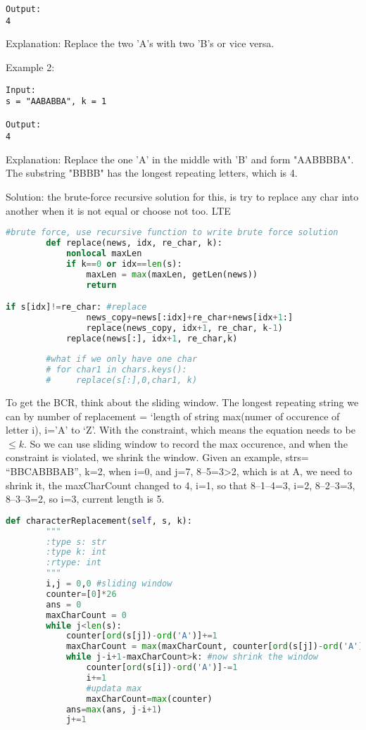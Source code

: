 \documentclass[../main.tex]{subfiles}
\begin{document}
\begin{enumerate}
\begin{lstlisting}
Output:
4
\end{lstlisting}

Explanation:
Replace the two 'A's with two 'B's or vice versa.

Example 2:
\begin{lstlisting}
Input:
s = "AABABBA", k = 1

Output:
4
\end{lstlisting}

Explanation:
Replace the one 'A' in the middle with 'B' and form "AABBBBA".
The substring "BBBB" has the longest repeating letters, which is 4.

Solution: the brute-force recursive solution for this, is try to replace any char into another when it is not equal or choose not too. LTE
\begin{lstlisting}[language = Python]
#brute force, use recursive function to write brute force solution
        def replace(news, idx, re_char, k):
            nonlocal maxLen
            if k==0 or idx==len(s):
                maxLen = max(maxLen, getLen(news))
                return

if s[idx]!=re_char: #replace
                news_copy=news[:idx]+re_char+news[idx+1:]
                replace(news_copy, idx+1, re_char, k-1)
            replace(news[:], idx+1, re_char,k)
        
        #what if we only have one char
        # for char1 in chars.keys():
        #     replace(s[:],0,char1, k)
\end{lstlisting}
To get the BCR, think about the sliding window. The longest repeating string we can by number of replacement = `length of string max(numer of occurence of letter i), i=’A’ to ‘Z’. With the constraint, which means the equation needs to be $\leq k$. So we can use sliding window to record the max occurence, and when the constraint is violated, we shrink the window. Given an example, strs= “BBCABBBAB”, k=2, when i=0, and j=7, 8–5=3>2, which is at A, we need to shrink it, the maxCharCount changed to 4, i=1, so that 8–1–4=3, i=2, 8–2–3=3, 8–3–3=2, so i=3, current length is 5.
\begin{lstlisting}[language = Python]
def characterReplacement(self, s, k):
        """
        :type s: str
        :type k: int
        :rtype: int
        """
        i,j = 0,0 #sliding window
        counter=[0]*26
        ans = 0
        maxCharCount = 0
        while j<len(s):
            counter[ord(s[j])-ord('A')]+=1
            maxCharCount = max(maxCharCount, counter[ord(s[j])-ord('A')])
            while j-i+1-maxCharCount>k: #now shrink the window
                counter[ord(s[i])-ord('A')]-=1
                i+=1
                #updata max
                maxCharCount=max(counter)
            ans=max(ans, j-i+1)
            j+=1
                

\end{lstlisting}
\end{enumerate}
\end{document}
